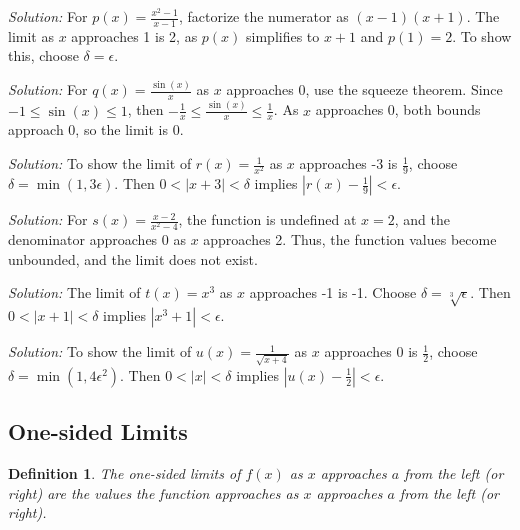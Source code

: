 \documentclass[a4paper,12pt]{book}
\newenvironment{solution}[1][]
{\par\noindent\textit{Solution:} \rmfamily}{\medskip}
\newtheorem{definition}{Definition}
\begin{document}
\begin{solution}[5]
For \( p(x) = \frac{x^2 - 1}{x - 1} \), factorize the numerator as \( (x - 1)(x + 1) \). The limit as \( x \) approaches 1 is 2, as \( p(x) \) simplifies to \( x + 1 \) and \( p(1) = 2 \). To show this, choose \(\delta = \epsilon\).
\end{solution}

\begin{solution}[6]
For \( q(x) = \frac{\sin(x)}{x} \) as \( x \) approaches 0, use the squeeze theorem. Since \( -1 \leq \sin(x) \leq 1 \), then \( -\frac{1}{x} \leq \frac{\sin(x)}{x} \leq \frac{1}{x} \). As \( x \) approaches 0, both bounds approach 0, so the limit is 0.
\end{solution}

\begin{solution}[7]
To show the limit of \( r(x) = \frac{1}{x^2} \) as \( x \) approaches -3 is \(\frac{1}{9}\), choose \(\delta = \min\left(1, 3\epsilon\right)\). Then \( 0 < |x + 3| < \delta \) implies \( |r(x) - \frac{1}{9}| < \epsilon \).
\end{solution}

\begin{solution}[8]
For \( s(x) = \frac{x - 2}{x^2 - 4} \), the function is undefined at \( x = 2 \), and the denominator approaches 0 as \( x \) approaches 2. Thus, the function values become unbounded, and the limit does not exist.
\end{solution}

\begin{solution}[9]
The limit of \( t(x) = x^3 \) as \( x \) approaches -1 is -1. Choose \(\delta = \sqrt[3]{\epsilon}\). Then \( 0 < |x + 1| < \delta \) implies \( |x^3 + 1| < \epsilon \).
\end{solution}

\begin{solution}[10]
To show the limit of \( u(x) = \frac{1}{\sqrt{x + 4}} \) as \( x \) approaches 0 is \(\frac{1}{2}\), choose \(\delta = \min\left(1, 4\epsilon^2\right)\). Then \( 0 < |x| < \delta \) implies \( |u(x) - \frac{1}{2}| < \epsilon \).
\end{solution}


\subsection{One-sided Limits}
\begin{definition}
The one-sided limits of \( f(x) \) as \( x \) approaches \( a \) from the left (or right) are the values the function approaches as \( x \) approaches \( a \) from the left (or right).
\end{definition}
\end{document}
